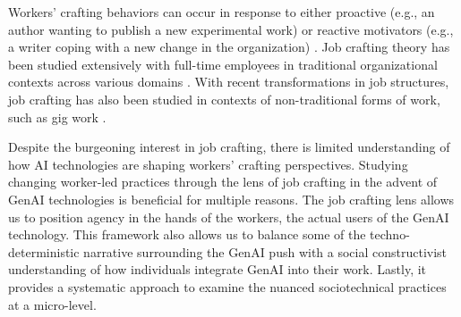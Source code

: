 Workers' crafting behaviors can occur in response to either proactive (e.g., an author wanting to publish a new experimental work) or reactive motivators (e.g., a writer coping with a new change in the organization) \cite{Lazazzara_2020}. 
Job crafting theory has been studied extensively with full-time employees in traditional organizational contexts across various domains \cite{Berg2010,Fuller2017}. 
With recent transformations in job structures, job crafting has also been studied in contexts of non-traditional forms of work, such as gig work \cite{Wong_Fieseler_2021}. 

Despite the burgeoning interest in job crafting, there is limited understanding of how AI technologies are shaping workers' crafting perspectives. Studying changing worker-led practices through the lens of job crafting in the advent of GenAI technologies is beneficial for multiple reasons. The job crafting lens allows us to position agency in the hands of the workers, the actual users of the GenAI technology. This framework also allows us to balance some of the techno-deterministic narrative surrounding the GenAI push with a social constructivist understanding of how individuals integrate GenAI into their work. Lastly, it provides a systematic approach to examine the nuanced sociotechnical practices at a micro-level.